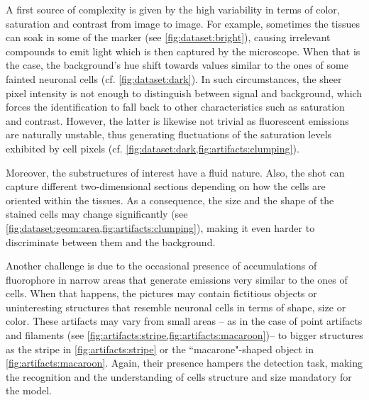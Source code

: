 A first source of complexity is given by the high variability in terms of color, saturation and contrast from image to image.
For example, sometimes the tissues can soak in some of the marker (see \cref{fig:dataset:bright}), causing irrelevant compounds to emit light which is then captured by the microscope. 
When that is the case, the background's hue shift towards values similar to the ones of some fainted neuronal cells (cf. \cref{fig:dataset:dark}).
In such circumstances, the sheer pixel intensity is not enough to distinguish between signal and background, which forces the identification to fall back to other characteristics such as saturation and contrast.
However, the latter is likewise not trivial as fluorescent emissions are naturally unstable, thus generating fluctuations of the saturation levels exhibited by cell pixels (cf. \cref{fig:dataset:dark,fig:artifacts:clumping}).

Moreover, the substructures of interest have a fluid nature. Also, the shot can capture different two-dimensional sections depending on how the cells are oriented within the tissues.
As a consequence, the size and the shape of the stained cells may change significantly (see \cref{fig:dataset:geom:area,fig:artifacts:clumping}), making it even harder to discriminate between them and the background.

Another challenge is due to the occasional presence of accumulations of fluorophore in narrow areas that generate emissions very similar to the ones of cells.
When that happens, the pictures may contain fictitious objects or uninteresting structures that resemble neuronal cells in terms of shape, size or color.
These artifacts may vary from small areas -- as in the case of point artifacts and filaments (see \cref{fig:artifacts:stripe,fig:artifacts:macaroon})-- to bigger structures as the stripe in \cref{fig:artifacts:stripe} or the ``macarone"-shaped object in \cref{fig:artifacts:macaroon}.
Again, their presence hampers the detection task, making the recognition and the understanding of cells structure and size mandatory for the model.

